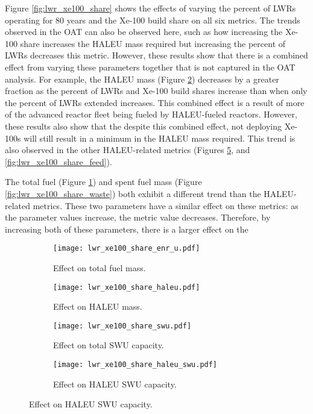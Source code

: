 Figure \ref{fig:lwr_xe100_share} shows the effects of varying the 
percent of \glspl{LWR} operating for 80 years and the Xe-100 
build share on all six metrics. The trends observed in the \gls{OAT} 
can also be observed here, such as how increasing the Xe-100 share 
increases the \gls{HALEU} mass required but increasing the 
percent of \glspl{LWR} decreases this metric. However, these results 
show that there is a combined effect from varying these parameters 
together that is not captured in the \gls{OAT} analysis. For 
example, the \gls{HALEU} mass (Figure \ref{fig:lwr_xe100_share_haleu}) 
decreases by a greater fraction 
as the percent of \glspl{LWR} and Xe-100 build shares increase than 
when only the percent of \glspl{LWR} extended increases. This combined 
effect is a result of more of the advanced reactor fleet being fueled 
by \gls{HALEU}-fueled reactors. However, these results also show that 
the despite this combined effect, not deploying Xe-100s will still
result in a minimum in the \gls{HALEU} mass required. This trend is also 
observed in the other \gls{HALEU}-related metrics (Figures \ref{fig:lwr_xe100_share_haleu_swu},
and \ref{fig:lwr_xe100_share_feed}). 

The total fuel (Figure \ref{fig:lwr_xe100_share_enr_u}) and spent fuel 
mass (Figure \ref{fig:lwr_xe100_share_waste}) both exhibit a different trend 
than the \gls{HALEU}-related metrics. These two parameters have a similar 
effect on these metrics: as the parameter values increase, the metric value 
decreases. Therefore, by increasing both of these parameters, there is a 
larger effect on the 

\begin{figure}
    \begin{subfigure}[t]{0.48\textwidth}
        \centering
        \texttt{[image: lwr\_xe100\_share\_enr\_u.pdf]}
        \caption{Effect on total fuel mass.}
        \label{fig:lwr_xe100_share_enr_u}
    \end{subfigure}
    \hfill
    \begin{subfigure}[t]{0.48\textwidth}
        \centering
        \texttt{[image: lwr\_xe100\_share\_haleu.pdf]}
        \caption{Effect on HALEU mass.}
        \label{fig:lwr_xe100_share_haleu}
    \end{subfigure}  
    \begin{subfigure}[t]{0.48\textwidth}
        \centering
        \texttt{[image: lwr\_xe100\_share\_swu.pdf]}
        \caption{Effect on total SWU capacity.}
        \label{fig:lwr_xe100_share_swu}
    \end{subfigure}
    \hfill
    \begin{subfigure}[t]{0.48\textwidth}
        \centering
        \texttt{[image: lwr\_xe100\_share\_haleu\_swu.pdf]}
        \caption{Effect on HALEU SWU capacity.}
        \label{fig:lwr_xe100_share_haleu_swu}
    \end{subfigure}
\end{figure}

